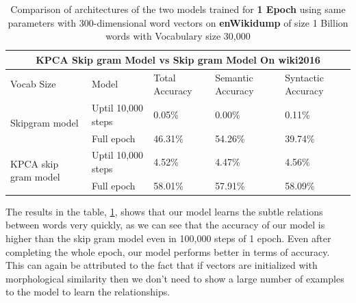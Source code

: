  \begin{table}[H]
 	\hskip-1.5cm
 	\begin{tabular}[htbp]{|l|l|l|l|l|}	
 		\hline		
 		\multicolumn{5}{|c|}{\textbf{KPCA Skip gram Model vs Skip gram Model On wiki2016}} \\
 		\hline
 		Vocab Size&Model&Total Accuracy&Semantic Accuracy&Syntactic Accuracy\\ 
 		\hline
 		\multirow{2}{*}{Skipgram model}
 		&Uptil 10,000 steps&0.05\%&0.00\%&0.11\%\\
 		&Full epoch&46.31\%&54.26\%&39.74\%\\
 		\hline
 		\multirow{2}{*}{KPCA skip gram model}
 		&Uptil 10,000 steps&4.52\%&4.47\%&4.56\%\\
 		&Full epoch&58.01\%&57.91\%&58.09\%\\
 		\hline
 	\end{tabular}
 	\caption{Comparison of architectures of the two models trained for \textbf{1 Epoch} using same parameters with 300-dimensional word vectors on \textbf{enWikidump} of size 1 Billion words with Vocabulary size 30,000}\label{tab:sesx}
 \end{table}
 The results in the table, \ref{tab:sesx}, shows that our model learns the subtle relations between words very quickly, as we can see that the accuracy of our model is higher than the skip gram model even in 100,000 steps of 1 epoch. Even after completing the whole epoch, our model performs better in terms of accuracy. This can again be attributed to the fact that if vectors are initialized with morphological similarity then we don't need to show a large number of examples to the model to learn the relationships.